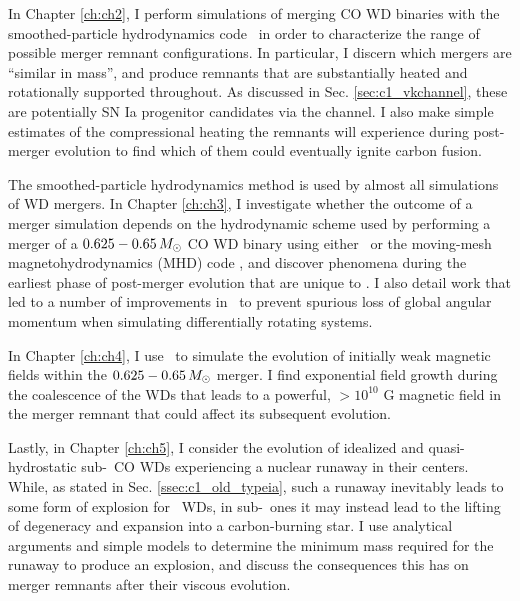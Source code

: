
In Chapter \ref{ch:ch2}, I perform simulations of merging CO WD binaries with the smoothed-particle hydrodynamics code \gasoline\ in order to characterize the range of possible merger remnant configurations.  In particular, I discern which mergers are ``similar in mass'', and produce remnants that are substantially heated and rotationally supported throughout.  As discussed in Sec. \ref{sec:c1_vkchannel}, these are potentially SN Ia progenitor candidates via the \citeal{vkercj10} channel.  I also make simple estimates of the compressional heating the remnants will experience during post-merger evolution to find which of them could eventually ignite carbon fusion.

The smoothed-particle hydrodynamics method is used by almost all simulations of WD mergers.  In Chapter \ref{ch:ch3}, I investigate whether the outcome of a merger simulation depends on the hydrodynamic scheme used by performing a merger of a $0.625 - 0.65\,\Msun$ CO WD binary using either \gasoline\ or the moving-mesh magnetohydrodynamics (MHD) code \arepo, and discover phenomena during the earliest phase of post-merger evolution that are unique to \arepo.  I also detail work that led to a number of improvements in \arepo\ to prevent spurious loss of global angular momentum when simulating differentially rotating systems.

In Chapter \ref{ch:ch4}, I use \arepo\ to simulate the evolution of initially weak magnetic fields within the $0.625 - 0.65\,\Msun$ merger.  I find exponential field growth during the coalescence of the WDs that leads to a powerful, $>10^{10}$ G magnetic field in the merger remnant that could affect its subsequent evolution.

Lastly, in Chapter \ref{ch:ch5}, I consider the evolution of idealized and quasi-hydrostatic sub-\Mch\ CO WDs experiencing a nuclear runaway in their centers.  While, as stated in Sec. \ref{ssec:c1_old_typeia}, such a runaway inevitably leads to some form of explosion for \Mch\ WDs, in sub-\Mch\ ones it may instead lead to the lifting of degeneracy and expansion into a carbon-burning star.  I use analytical arguments and simple models to determine the minimum mass required for the runaway to produce an explosion, and discuss the consequences this has on merger remnants after their viscous evolution.


